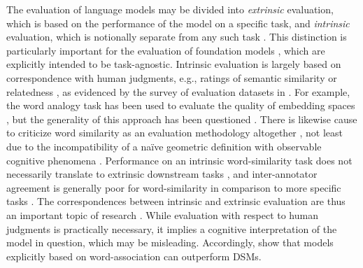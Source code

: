 The evaluation of language models may be divided into \emph{extrinsic} evaluation,
which is based on the performance of the model on a specific task, and \emph{intrinsic}
evaluation, which is notionally separate from any such task
\parencites[38]{Wang2020a}{Torregrossa2021}[91-96]{Bommasani2022}.
This distinction is particularly important for the evaluation of foundation models
, which are explicitly intended to be
task-agnostic.
Intrinsic evaluation is largely based on correspondence with human judgments, e.g.,
ratings of semantic similarity or relatedness \parencites[17]{Lenci2023}, as evidenced
by the survey of evaluation datasets in \textcites[1281]{Lenci2022}.
For example, the word analogy task  has been used to
evaluate the quality of embedding spaces
\parencites[4-5]{Mnih2013}{Levy2014}{Pennington2014}, but the generality of this
approach has been questioned \parencites[1300]{Lenci2022}.
There is likewise cause to criticize word similarity as an evaluation methodology
altogether \parencites[]{Batchkarov2016}, not least due to the incompatibility of a
naïve geometric definition with observable cognitive phenomena
\parencites[3-11]{Lewis2022}.
Performance on an intrinsic word-similarity task does not necessarily translate to
extrinsic downstream tasks \parencites[7-8]{Batchkarov2016}, and inter-annotator
agreement is generally poor for word-similarity in comparison to more specific tasks
\parencites[8-9]{Batchkarov2016}.
The correspondences between intrinsic and extrinsic evaluation are thus an important
topic of research \parencites[92-94]{Bommasani2022}.
While evaluation with respect to human judgments is practically necessary, it implies a
cognitive interpretation of the model in question, which may be misleading.
Accordingly, \textcites{DeDeyne2016} show that models explicitly based on
word-association can outperform DSMs.

